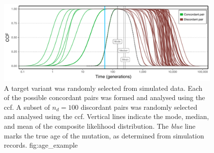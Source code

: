 

\begin{figure}[!htb]
\centering
\includegraphics[width=\textwidth]{./img/ch5/age_example}
%
{A target variant was randomly selected from simulated data.
Each of the possible concordant pairs was formed and analysed using the \gls{ccf}.
A subset of ${n_d = \num{100}}$ discordant pairs was randomly selected and analysed using the \gls{ccf}.
Vertical lines indicate the mode, median, and mean of the composite likelihood distribution.
The \emph{blue} line marks the true age of the mutation, as determined from simulation records.}%
{fig:age_example}
\end{figure}
